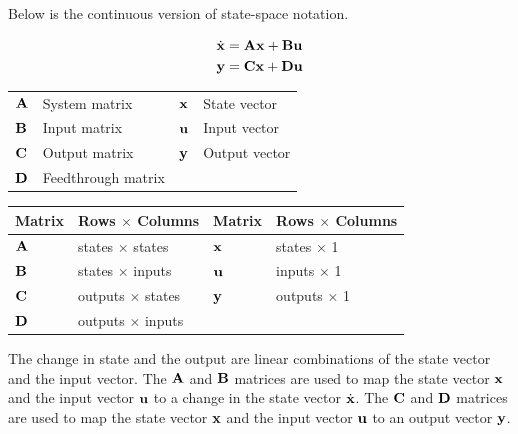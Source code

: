 Below is the continuous version of state-space notation.
\begin{definition}%
  \begin{align}
    \dot{\mathbf{x}} &= \mathbf{A}\mathbf{x} + \mathbf{B}\mathbf{u} \label{eq:cont_ss_x} \\
    \mathbf{y} &= \mathbf{C}\mathbf{x} + \mathbf{D}\mathbf{u} \label{eq:cont_ss_y}
  \end{align}
  \begin{figurekey}
    \begin{tabular}{llll}
      $\mathbf{A}$ & System matrix      & $\mathbf{x}$ & State vector \\
      $\mathbf{B}$ & Input matrix       & $\mathbf{u}$ & Input vector \\
      $\mathbf{C}$ & Output matrix      & $\mathbf{y}$ & Output vector \\
      $\mathbf{D}$ & Feedthrough matrix &  &  \\
    \end{tabular}
  \end{figurekey}
\end{definition}
\begin{booktable}
  \begin{tabular}{|ll|ll|}
    \hline
    \rowcolor{headingbg}
    \textbf{Matrix} & \textbf{Rows $\times$ Columns} &
    \textbf{Matrix} & \textbf{Rows $\times$ Columns} \\
    \hline
    $\mathbf{A}$ & states $\times$ states & $\mathbf{x}$ & states $\times$ 1 \\
    $\mathbf{B}$ & states $\times$ inputs & $\mathbf{u}$ & inputs $\times$ 1 \\
    $\mathbf{C}$ & outputs $\times$ states & $\mathbf{y}$ & outputs $\times$ 1 \\
    $\mathbf{D}$ & outputs $\times$ inputs &  &  \\
    \hline
  \end{tabular}
  \caption{State-space matrix dimensions}
\end{booktable}

The change in \gls{state} and the \gls{output} are linear combinations of the
\gls{state} vector and the \gls{input} vector. The $\mathbf{A}$ and $\mathbf{B}$
matrices are used to map the \gls{state} vector $\mathbf{x}$ and the \gls{input}
vector $\mathbf{u}$ to a change in the \gls{state} vector $\dot{\mathbf{x}}$. The
$\mathbf{C}$ and $\mathbf{D}$ matrices are used to map the \gls{state} vector
$\mathbf{x}$ and the \gls{input} vector $\mathbf{u}$ to an \gls{output} vector
$\mathbf{y}$.
